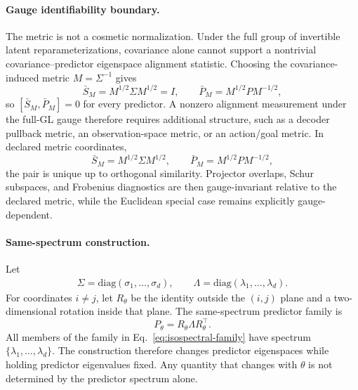 \documentclass{article}
\begin{document}
\paragraph{Gauge identifiability boundary.}
The metric is not a cosmetic normalization. Under the full group of invertible
latent reparameterizations, covariance alone cannot support a nontrivial
covariance--predictor eigenspace alignment statistic. Choosing the
covariance-induced metric $M=\Sigma^{-1}$ gives
\begin{equation}
\bar S_M=M^{1/2}\Sigma M^{1/2}=I,
\qquad
\bar P_M=M^{1/2}PM^{-1/2},
\label{eq:covariance-only-gauge-collapse}
\end{equation}
so $[\bar S_M,\bar P_M]=0$ for every predictor. A nonzero alignment
measurement under the full-GL gauge therefore requires additional structure,
such as a decoder pullback metric, an observation-space metric, or an
action/goal metric. In declared metric coordinates,
\begin{equation}
\bar S_M=M^{1/2}\Sigma M^{1/2},
\qquad
\bar P_M=M^{1/2}PM^{-1/2},
\label{eq:metric-whitened-pair}
\end{equation}
the pair is unique up to orthogonal similarity. Projector overlaps, Schur
subspaces, and Frobenius diagnostics are then gauge-invariant relative to the
declared metric, while the Euclidean special case remains explicitly
gauge-dependent.

\paragraph{Same-spectrum construction.}
Let
\begin{equation}
\label{eq:isospectral-diagonals}
\begin{aligned}
\Sigma=\mathrm{diag}(\sigma_1,\ldots,\sigma_d),\qquad
\Lambda=\mathrm{diag}(\lambda_1,\ldots,\lambda_d).
\end{aligned}
\end{equation}
For coordinates $i\neq j$, let $R_\theta$ be the identity outside the $(i,j)$ plane and a two-dimensional rotation inside that plane. The same-spectrum predictor family is
\begin{equation}
P_\theta=R_\theta\Lambda R_\theta^\top .
\label{eq:isospectral-family}
\end{equation}
All members of the family in Eq.~\eqref{eq:isospectral-family} have spectrum $\{\lambda_1,\ldots,\lambda_d\}$. The construction therefore changes predictor eigenspaces while holding predictor eigenvalues fixed. Any quantity that changes with $\theta$ is not determined by the predictor spectrum alone.
\end{document}
